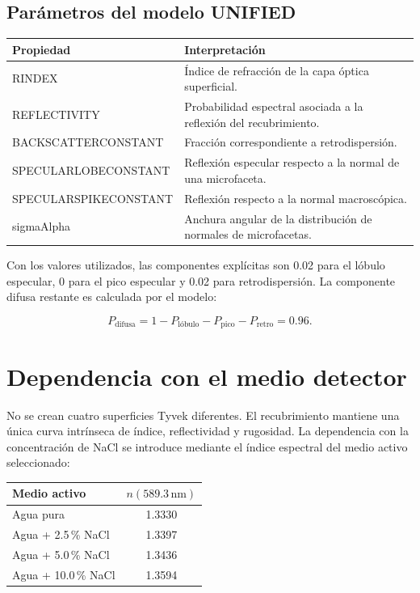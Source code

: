 \documentclass[11pt,a4paper]{article}
\begin{document}
\subsection{Parámetros del modelo UNIFIED}

\begin{center}
\begin{tabularx}{\textwidth}{>{\ttfamily}l X}
\toprule
\normalfont\textbf{Propiedad} & \textbf{Interpretación}\\
\midrule
RINDEX & Índice de refracción de la capa óptica superficial.\\
REFLECTIVITY & Probabilidad espectral asociada a la reflexión del recubrimiento.\\
BACKSCATTERCONSTANT & Fracción correspondiente a retrodispersión.\\
SPECULARLOBECONSTANT & Reflexión especular respecto a la normal de una microfaceta.\\
SPECULARSPIKECONSTANT & Reflexión respecto a la normal macroscópica.\\
sigmaAlpha & Anchura angular de la distribución de normales de microfacetas.\\
\bottomrule
\end{tabularx}
\end{center}

Con los valores utilizados, las componentes explícitas son 0.02 para el lóbulo
especular, 0 para el pico especular y 0.02 para retrodispersión. La componente
difusa restante es calculada por el modelo:

\begin{equation}
P_{\text{difusa}}
=1-P_{\text{lóbulo}}-P_{\text{pico}}-P_{\text{retro}}
=0.96.
\end{equation}

\section{Dependencia con el medio detector}

No se crean cuatro superficies Tyvek diferentes. El recubrimiento mantiene una
única curva intrínseca de índice, reflectividad y rugosidad. La dependencia con
la concentración de NaCl se introduce mediante el índice espectral del medio
activo seleccionado:

\begin{center}
\begin{tabular}{lc}
\toprule
Medio activo & $n(589.3\,\mathrm{nm})$\\
\midrule
Agua pura & 1.3330\\
Agua + 2.5\,\% NaCl & 1.3397\\
Agua + 5.0\,\% NaCl & 1.3436\\
Agua + 10.0\,\% NaCl & 1.3594\\
\bottomrule
\end{tabular}
\end{center}
\end{document}
